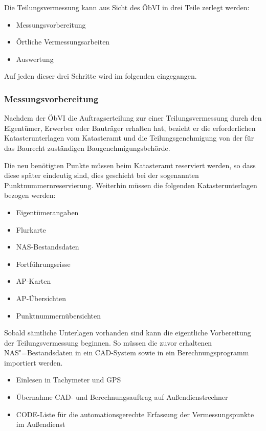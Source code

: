 Die Teilungsvermessung kann aus Sicht des \ac{ÖbVI} in drei Teile zerlegt werden:
\begin{itemize}
	\item Messungsvorbereitung
	\item Örtliche Vermessungsarbeiten
	\item Auswertung
\end{itemize}

Auf jeden dieser drei Schritte wird im folgenden eingegangen.

\subsubsection{Messungsvorbereitung}

Nachdem der \ac{ÖbVI} die Auftragserteilung zur einer Teilungsvermessung durch den Eigentümer, Erwerber oder Bauträger erhalten hat, bezieht er die erforderlichen Katasterunterlagen vom Katasteramt und die Teilungsgenehmigung von der für das Baurecht zuständigen Baugenehmigungsbehörde.

Die neu benötigten Punkte müssen beim Katasteramt reserviert werden, so dass diese später eindeutig sind, dies geschieht bei der sogenannten Punktnummernreservierung. Weiterhin müssen die folgenden Katasterunterlagen bezogen werden:
\begin{itemize}
	\item Eigentümerangaben
	\item Flurkarte
	\item NAS-Bestandsdaten
	\item Fortführungsrisse
	\item AP-Karten
	\item AP-Übersichten
	\item Punktnummernübersichten
\end{itemize}
Sobald sämtliche Unterlagen vorhanden sind kann die eigentliche Vorbereitung der Teilungsvermessung beginnen. So müssen die zuvor erhaltenen NAS"=Bestandsdaten in ein CAD-System sowie in ein Berechnungsprogramm importiert werden.
\begin{itemize}
	\item Einlesen in Tachymeter und GPS
	\item Übernahme CAD- und Berechnungsauftrag auf Außendienstrechner
	\item CODE-Liste für die automationsgerechte Erfassung der Vermessungspunkte im Außendienst
\end{itemize}

